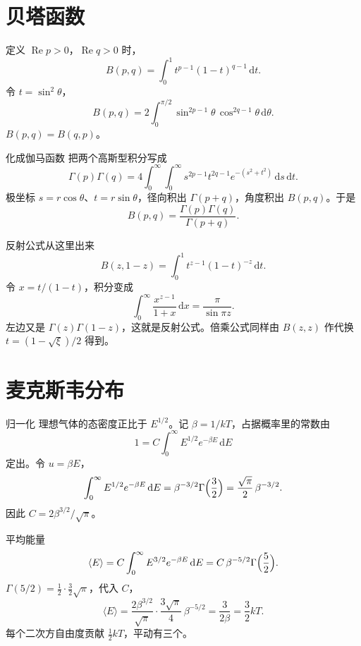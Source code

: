 \documentclass[fontset=windows, chinese, 10pt, xcolor=dvipsnames]{beamer}
\begin{document}
\section{贝塔函数}

\begin{frame}{定义}
  $\operatorname{Re} p>0$，$\operatorname{Re} q>0$ 时，
  \begin{equation*}
    B(p,q)=\int_0^{1} t^{p-1}(1-t)^{q-1}\,\mathrm{d}t.
  \end{equation*}
  令 $t=\sin^2\theta$，
  \[
    B(p,q)
    =2\int_0^{\pi/2}
      \sin^{2p-1}\theta\,\cos^{2q-1}\theta\,\mathrm{d}\theta.
  \]
  $B(p,q)=B(q,p)$。
\end{frame}

\begin{frame}{化成伽马函数}
  把两个高斯型积分写成
  \[
    \Gamma(p)\Gamma(q)
    =4\int_0^{\infty}\!\!\int_0^{\infty}
      s^{2p-1}t^{2q-1}e^{-(s^2+t^2)}\,\mathrm{d}s\,\mathrm{d}t.
  \]
  极坐标 $s=r\cos\theta$、$t=r\sin\theta$，径向积出 $\Gamma(p+q)$，角度积出 $B(p,q)$。于是
  \begin{equation*}
    \boxed{\displaystyle
      B(p,q)=\frac{\Gamma(p)\Gamma(q)}{\Gamma(p+q)}.}
  \end{equation*}
\end{frame}

\begin{frame}{反射公式从这里出来}
  \[
    B(z,1-z)
    =\int_0^{1} t^{z-1}(1-t)^{-z}\,\mathrm{d}t.
  \]
  令 $x=t/(1-t)$，积分变成
  \[
    \int_0^{\infty}\frac{x^{z-1}}{1+x}\,\mathrm{d}x
    =\frac{\pi}{\sin\pi z}.
  \]
  左边又是 $\Gamma(z)\Gamma(1-z)$，这就是反射公式。倍乘公式同样由 $B(z,z)$ 作代换 $t=(1-\sqrt{\xi})/2$ 得到。
\end{frame}

\section{麦克斯韦分布}

\begin{frame}{归一化}
  理想气体的态密度正比于 $E^{1/2}$。记 $\beta=1/kT$，占据概率里的常数由
  \[
    1=C\int_0^{\infty} E^{1/2}e^{-\beta E}\,\mathrm{d}E
  \]
  定出。令 $u=\beta E$，
  \[
    \int_0^{\infty} E^{1/2}e^{-\beta E}\,\mathrm{d}E
    =\beta^{-3/2}\Gamma\Bigl(\frac32\Bigr)
    =\frac{\sqrt{\pi}}{2}\,\beta^{-3/2}.
  \]
  因此 $C=2\beta^{3/2}/\sqrt{\pi}$。
\end{frame}

\begin{frame}{平均能量}
  \[
    \langle E\rangle
    =C\int_0^{\infty} E^{3/2}e^{-\beta E}\,\mathrm{d}E
    =C\,\beta^{-5/2}\Gamma\Bigl(\frac52\Bigr).
  \]
  $\Gamma(5/2)=\frac12\cdot\frac32\sqrt{\pi}$，代入 $C$，
  \[
    \langle E\rangle
    =\frac{2\beta^{3/2}}{\sqrt{\pi}}
      \cdot\frac{3\sqrt{\pi}}{4}\,\beta^{-5/2}
    =\frac{3}{2\beta}
    =\frac32 kT.
  \]
  每个二次方自由度贡献 $\frac12 kT$，平动有三个。
\end{frame}
\end{document}
